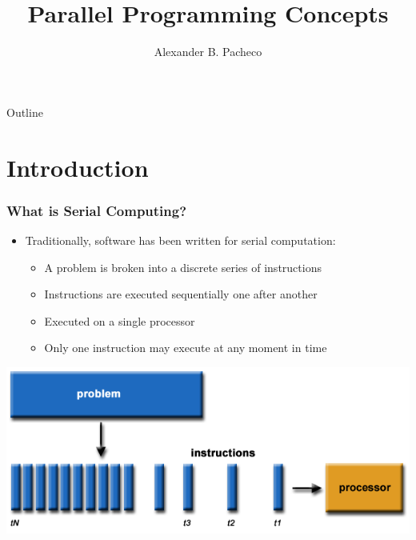 \documentclass[10pt,t]{beamer}
\title{Parallel Programming Concepts}
\subtitle{}
\author{Alexander B. Pacheco}
\institute{\href{http://researchcomputing.lehigh.edu}{LTS Research Computing}}
\begin{document}
\begin{frame}
  \titlepage
\end{frame}

\begin{frame}[c]{Outline}
  \tableofcontents
\end{frame}

\section{Introduction}
\begin{frame}
  \frametitle{What is Serial Computing?}
  \begin{itemize}
  \item Traditionally, software has been written for serial computation:
    \begin{itemize}
    \item A problem is broken into a discrete series of instructions
    \item Instructions are executed sequentially one after another
    \item Executed on a single processor
    \item Only one instruction may execute at any moment in time
    \end{itemize}
  \end{itemize}
  \includegraphics[width=\textwidth]{./serialProblem}
\end{frame}
\end{document}
